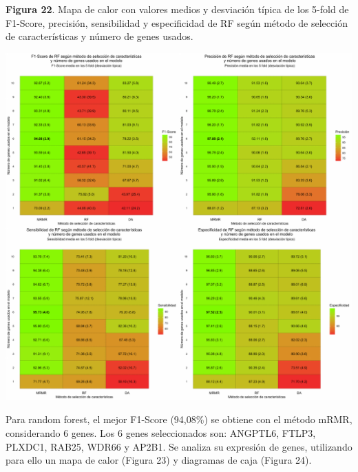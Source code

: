 \begin{center}
\textbf{Figura 22}. Mapa de calor con valores medios y desviación típica de los 5-fold de F1-Score, precisión, sensibilidad y especificidad de RF según método de selección de características y número de genes usados.
\end{center}
\begin{center}
	\includegraphics[width=1\textwidth]{figuras/22_higado_multiclase_heatmap_rf.pdf} 
\end{center}

Para random forest, el mejor F1-Score (94,08\%) se obtiene con el método mRMR, considerando 6 genes. Los 6 genes seleccionados son: ANGPTL6, FTLP3, PLXDC1, RAB25, WDR66
y AP2B1. Se analiza su expresión de genes, utilizando para ello un mapa de calor (Figura 23) y diagramas de caja (Figura 24).\\

